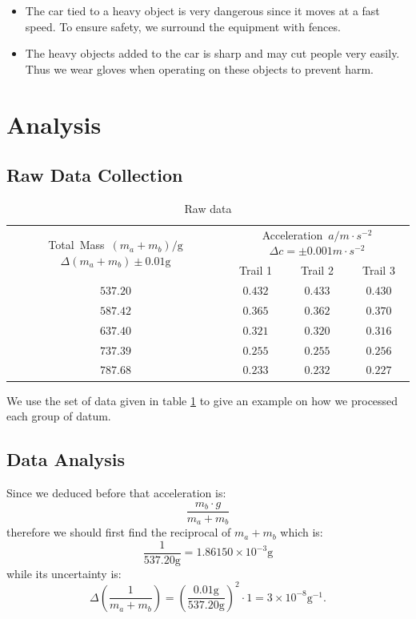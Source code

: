 \documentclass{article}
\begin{document}
\begin{itemize}
  \item The car tied to a heavy object is very dangerous since it moves at a fast speed. To ensure safety, we surround the equipment with fences.
  \item The heavy objects added to the car is sharp and may cut people very easily. Thus we wear gloves when operating on these objects to prevent harm.
\end{itemize}

\section{Analysis}

\subsection{Raw Data Collection}

\begin{table}
  \centering
  \begin{tabular}{|c|c|c|c|}
    \hline
    \multirow{2}{*}{\vbox{\hbox{Total Mass $(m_a + m_b) / \text{g}$} \hbox{$\Delta (m_a + m_b) \pm 0.01 \text{g}$}}} & \multicolumn{3}{|c|}{\vbox{\hbox{Acceleration $a / m \cdot s^{-2}$} \hbox{$\Delta c = \pm 0.001 m \cdot s^{-2}$}}} \\
    \cline{2-4}
    & Trail 1 & Trail 2 & Trail 3 \\
    \hline
    $537.20$ & $0.432$ & $0.433$ & $0.430$ \\
    \hline
    $587.42$ & $0.365$ & $0.362$ & $0.370$ \\
    \hline
    $637.40$ & $0.321$ & $0.320$ & $0.316$ \\
    \hline
    $737.39$ & $0.255$ & $0.255$ & $0.256$ \\
    \hline
    $787.68$ & $0.233$ & $0.232$ & $0.227$ \\
    \hline
  \end{tabular}
  \caption{Raw data}
  \label{tab:raw}
\end{table}

We use the set of data given in table \ref{tab:raw} to give an example on how we processed each group of datum.

\subsection{Data Analysis}

Since we deduced before that acceleration is:
\[
  \frac{m_b \cdot g}{m_a + m_b}
\]
therefore we should first find the reciprocal of $m_a + m_b$ which is:
\[
  \frac{1}{537.20 \text{g}} = 1.86150 \times 10^{-3} \text{g}
\]
while its uncertainty is:
\[
  \Delta \left( \frac{1}{m_a + m_b} \right) = \left( \frac{0.01 \text{g}}{537.20 \text{g}} \right)^2 \cdot 1 = 3 \times 10^{-8} \text{g}^{-1}.
\]
\end{document}
